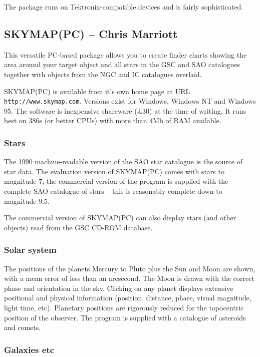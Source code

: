 \documentclass[twoside,11pt]{article}
\newcommand{\htmladdnormallink}[2]{#1}
\newcommand{\xlabel}[1]{}
\newcommand{\SKYMAPPCref}{\htmladdnormallink{SKYMAP(PC)}{http://www.skymap.com}}
\newcommand{\GSCref}{\htmladdnormallink{GSC}{http://www-gsss.stsci.edu/casbhome.html}}
\newcommand{\HTTPCref}{\htmladdnormallink{\tt http://www.skymap.com}{http://www.skymap.com}}
\begin{document}
The package runs on Tektronix-compatible devices and is fairly sophisticated.


\subsection{{\SKYMAPPCref} -- Chris Marriott} \xlabel{SKYMAPPC}
\label{sec:skymappc}

This versatile PC-based package allows you to create finder charts showing
the area around your target object and all stars in the {\GSCref} and SAO
catalogues together with objects from the NGC and IC catalogues overlaid.

{\SKYMAPPCref} is available from it's own home page at
URL {\HTTPCref}. Versions exist for Windows, Windows NT and Windows 95.
The software is inexpensive shareware (\pounds 30) at the time
of writing. It runs best on 386s (or better CPUs) with more than 4Mb of RAM
available.


\subsubsection{Stars}

The 1990 machine-readable version of the SAO star catalogue is the source of
star data. The evaluation version of {\SKYMAPPCref} comes with stars to magnitude 7;
the commercial version of the program is supplied with the complete SAO
catalogue of stars -- this is reasonably complete down to magnitude 9.5.

The commercial version of {\SKYMAPPCref} can also display stars (and other objects)
read from the {\GSCref} CD-ROM database.

\subsubsection{Solar system}

The positions of the planets Mercury to Pluto plus the Sun and Moon are
shown, with a mean error of less than an arcsecond. The Moon is drawn with
the correct phase and orientation in the sky. Clicking on any planet displays
extensive positional and physical information (position, distance, phase,
visual magnitude, light time, etc). Planetary positions are rigorously
reduced for the topocentric position of the observer.
The program is supplied with a catalogue of asteroids and comets.

\subsubsection{Galaxies etc}
\end{document}
